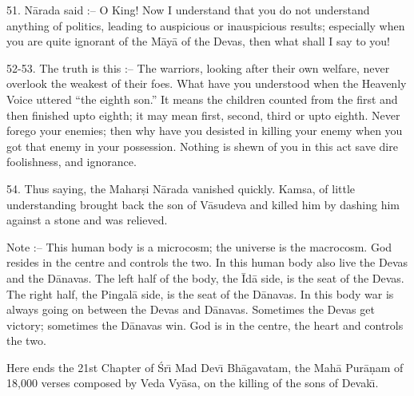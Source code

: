 51. N\=arada said :-- O King! Now I understand that you do not understand anything of politics, leading to auspicious or inauspicious results; especially when you are quite ignorant of the M\=ay\=a of the Devas, then what shall I say to you!

52-53. The truth is this :-- The warriors, looking after their own welfare, never overlook the weakest of their foes. What have you understood when the Heavenly Voice uttered ``the eighth son.'' It means the children counted from the first and then finished upto eighth; it may mean first, second, third or upto eighth. Never forego your enemies; then why have you desisted in killing your enemy when you got that enemy in your possession. Nothing is shewn of you in this act save dire foolishness, and ignorance.

54. Thus saying, the Mahar\d{s}i N\=arada vanished quickly. Kamsa, of little understanding brought back the son of V\=asudeva and killed him by dashing him against a stone and was relieved.

Note :-- This human body is a microcosm; the universe is the macrocosm. God resides in the centre and controls the two. In this human body also live the Devas and the D\=anavas. The left half of the body, the \=Id\=a side, is the seat of the Devas. The right half, the Pingal\=a side, is the seat of the D\=anavas. In this body war is always going on between the Devas and D\=anavas. Sometimes the Devas get victory; sometimes the D\=anavas win. God is in the centre, the heart and controls the two.

Here ends the 21st Chapter of \'Sr\={\i} Mad Dev\={\i} Bh\=agavatam, the Mah\=a Pur\=a\d{n}am of 18,000 verses composed by Veda Vy\=asa, on the killing of the sons of Devak\={\i}.



